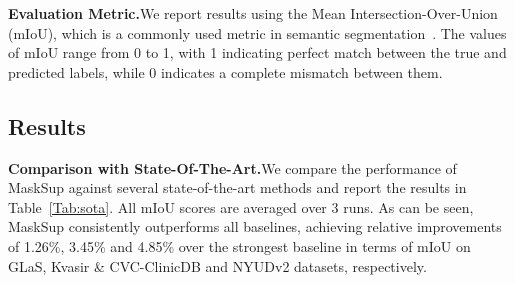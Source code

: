 \documentclass{bmvc2k}
\begin{document}
\medskip\noindent\textbf{Evaluation Metric.}\quad We report results using the Mean Intersection-Over-Union (mIoU), which is a commonly used metric in semantic segmentation~\cite{ronneberger2015u,wang2020axial,valanarasu2021medical,valanarasu2021kiu,xu2021levit}. The values of mIoU range from 0 to 1, with 1 indicating perfect match between the true and predicted labels, while 0 indicates a complete mismatch between them.

\subsection{Results}
\noindent\textbf{Comparison with State-Of-The-Art.}\quad We compare the performance of MaskSup against several state-of-the-art methods and report the results in Table~\ref{Tab:sota}. All mIoU scores are averaged over 3 runs. As can be seen, MaskSup consistently outperforms all baselines, achieving relative improvements of 1.26\%, 3.45\% and 4.85\% over the strongest baseline in terms of mIoU on GLaS, Kvasir \& CVC-ClinicDB and NYUDv2 datasets, respectively.
\end{document}
